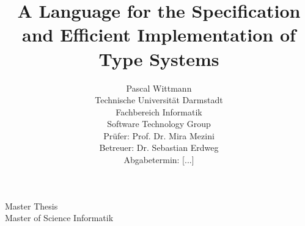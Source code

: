 \documentclass[a4paper,twoside]{report}
\begin{document}

\begin{center}
  Master Thesis \\
  Master of Science Informatik
\end{center}

\title{A Language for the Specification and Efficient Implementation
  of Type Systems}
\author{
Pascal Wittmann \\[6cm]
\small Technische Universität Darmstadt \\
\small Fachbereich Informatik \\
\small Software Technology Group \\[0.5cm]
\small Prüfer: Prof. Dr. Mira Mezini \\
\small Betreuer: Dr. Sebastian Erdweg \\[0.5cm]
\small Abgabetermin: [...]
}
\date{}

\begingroup
\let\newpage\relax%
\maketitle
\endgroup
\end{document}
